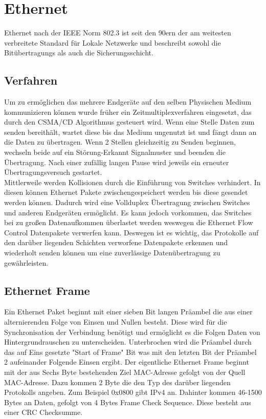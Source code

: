 \section{Ethernet}

Ethernet nach der IEEE Norm 802.3 ist seit den 90ern der am weitesten verbreitete Standard für Lokale Netzwerke und beschreibt sowohl die Bitübertragungs als auch die Sicherungsschicht. \\
\subsection{Verfahren}
Um zu ermöglichen das mehrere Endgeräte auf den selben Physischen Medium kommunizieren können wurde früher ein Zeitmultiplexverfahren eingesetzt, das durch den CSMA/CD Algorithmus gesteuert wird. Wenn eine Stelle Daten zum senden bereithält, wartet diese bis das Medium ungenutzt ist und fängt dann an die Daten zu übertragen. Wenn 2 Stellen gleichzeitig zu Senden beginnen, wechseln beide auf ein Störung-Erkannt Signalmuster und beenden die Übertragung. Nach einer zufällig langen Pause wird jeweils ein erneuter Übertragungsversuch gestartet.\\
Mittlerweile werden Kollisionen durch die Einführung von Switches verhindert. In diesen können Ethernet Pakete zwischengespeichert werden bis diese gesendet werden können. Dadurch wird eine Vollduplex Übertragung zwischen Switches und anderen Endgeräten ermöglicht. Es kann jedoch vorkommen, das Switches bei zu großen Datenaufkommen überlastet werden weswegen die Ethernet Flow Control Datenpakete verwerfen kann. Deswegen ist es wichtig, das Protokolle auf den darüber liegenden Schichten verworfene Datenpakete erkennen und wiederholt senden können um eine zuverlässige Datenübertragung zu gewährleisten. 

\subsection{Ethernet Frame}

Ein Ethernet Paket beginnt mit einer sieben Bit langen Präambel die aus einer alternierenden Folge von Einsen und Nullen besteht. Diese wird für die Synchronisation der Verbindung benötigt und ermöglicht es die Folgen Daten von Hintergrundrauschen zu unterscheiden. Unterbrochen wird die Präambel durch das auf Eins gesetzte "Start of Frame" Bit was mit den letzten Bit der Präambel 2 aufeinander Folgende Einsen ergibt. 
Der eigentliche Ethernet Frame beginnt mit der aus Sechs Byte bestehenden Ziel MAC-Adresse gefolgt von der Quell MAC-Adresse. 
Dazu kommen 2 Byte die den Typ des darüber liegenden Protokolls angeben. Zum Beispiel 0x0800 gibt IPv4 an. Dahinter kommen 46-1500 Bytes an Daten, gefolgt von 4 Bytes Frame Check Sequence. Diese besteht aus einer CRC Checksumme. 



